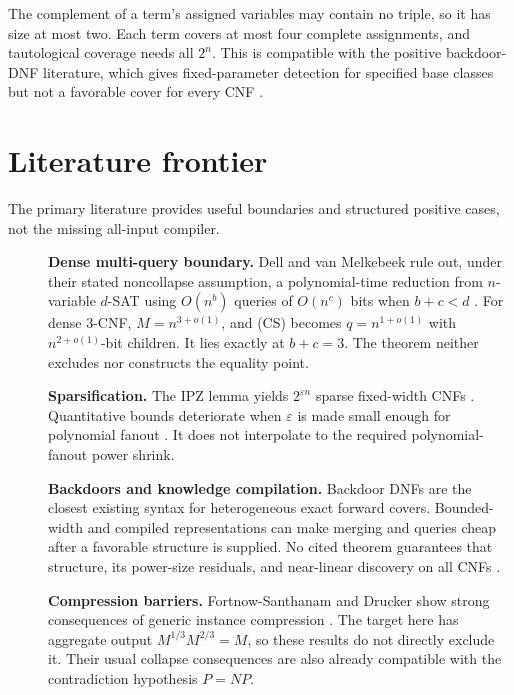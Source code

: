 \documentclass[11pt]{article}
\begin{document}
The complement of a term's assigned variables may contain no triple, so it
has size at most two.  Each term covers at most four complete assignments,
and tautological coverage needs all $2^n$.  This is compatible with the
positive backdoor-DNF literature, which gives fixed-parameter detection for
specified base classes but not a favorable cover for every CNF
\cite{ordyniak2021bdnf,dreier2022}.

\section{Literature frontier}

The primary literature provides useful boundaries and structured positive
cases, not the missing all-input compiler.

\begin{description}
\item[] \textbf{Dense multi-query boundary.}
Dell and van Melkebeek rule out, under their stated noncollapse assumption, a
polynomial-time reduction from $n$-variable $d$-SAT using $O(n^b)$ queries of
$O(n^c)$ bits when $b+c<d$ \cite{dellvanmelkebeek2014}.  For dense 3-CNF,
$M=n^{3+o(1)}$, and (CS) becomes $q=n^{1+o(1)}$ with
$n^{2+o(1)}$-bit children.  It lies exactly at $b+c=3$.  The theorem neither
excludes nor constructs the equality point.

\item[] \textbf{Sparsification.}
The IPZ lemma yields $2^{\varepsilon n}$ sparse fixed-width CNFs
\cite{ipz2001}.  Quantitative bounds deteriorate when $\varepsilon$ is made
small enough for polynomial fanout \cite{calabro2010}.  It does not
interpolate to the required polynomial-fanout power shrink.

\item[] \textbf{Backdoors and knowledge compilation.}
Backdoor DNFs are the closest existing syntax for heterogeneous exact forward
covers.  Bounded-width and compiled representations can make merging and
queries cheap after a favorable structure is supplied.  No cited theorem
guarantees that structure, its power-size residuals, and near-linear
discovery on all CNFs \cite{ordyniak2021bdnf,darwiche2002}.

\item[] \textbf{Compression barriers.}
Fortnow-Santhanam and Drucker show strong consequences of generic instance
compression \cite{fortnowsanthanam2011,drucker2015}.  The target here has
aggregate output $M^{1/3}M^{2/3}=M$, so these results do not directly exclude
it.  Their usual collapse consequences are also already compatible with the
contradiction hypothesis $P=NP$.


\end{description}
\end{document}
